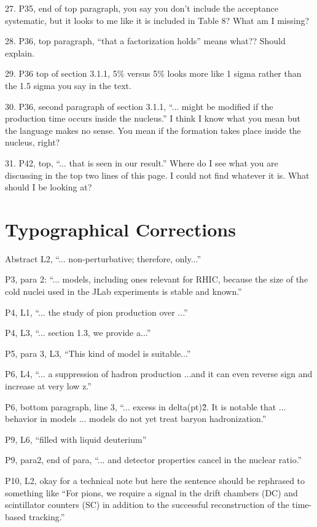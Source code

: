 \documentclass[12pt]{article}
\begin{document}
27.
P35, end of top paragraph, you say you don’t include the acceptance systematic, but it looks 
to me like it is included in Table 8?  What am I missing?



28.
P36, top paragraph, “that a factorization holds” means what??  Should explain.  



29.
P36 top of section 3.1.1, 5\% versus 5\% looks more like 1 sigma rather than the 1.5 sigma 
you say in the text.



30.
P36, second paragraph of section 3.1.1, “... might be modified if the production time occurs 
inside the nucleus.”  I think I know what you mean but the language makes no sense.  You 
mean if the formation takes place inside the nucleus, right?



31.
P42, top, “... that is seen in our result.”  Where do I see what you are discussing in the top 
two lines of this page.  I could not find whatever it is.  What should I be looking at?

\section{Typographical Corrections}

Abstract L2, “... non-perturbative; therefore, only...”

P3, para 2:  “... models, including ones relevant for RHIC, because the size of the cold nuclei 
used in the JLab experiments is stable and known.”

P4, L1, “... the study of pion production over ...”

P4, L3, “... section 1.3, we provide a...”

P5, para 3, L3, “This kind of model is suitable...”

P6, L4, “... a suppression of hadron production ...and it can even reverse sign and increase at 
very low z.”

P6, bottom paragraph, line 3, “... excess in delta(pt)\^2.  It is notable that ... behavior in models 
... models do not yet treat baryon hadronization.”

P9, L6, “filled with liquid deuterium”

P9, para2, end of para, “... and detector properties cancel in the nuclear ratio.”

P10, L2, okay for a technical note but here the sentence should be rephrased to something like 
“For pions, we require a signal in the drift chambers (DC) and scintillator counters (SC) in 
addition to the successful reconstruction of the time-based tracking.”
\end{document}
